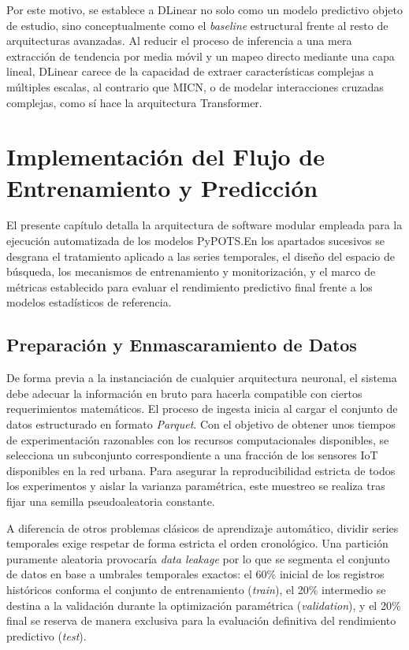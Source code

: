 Por este motivo, se establece a DLinear no solo como un modelo predictivo objeto de estudio, sino conceptualmente como el \textit{baseline} estructural frente al resto de arquitecturas avanzadas. Al reducir el proceso de inferencia a una mera extracción de tendencia por media móvil y un mapeo directo mediante una capa lineal, DLinear carece de la capacidad de extraer características complejas a múltiples escalas, al contrario que MICN, o de modelar interacciones cruzadas complejas, como sí hace la arquitectura Transformer.





\section{Implementación del Flujo de Entrenamiento y Predicción}
\label{flujo_imput_pred}

El presente capítulo detalla la arquitectura de software modular empleada para la ejecución automatizada de los modelos PyPOTS.En los apartados sucesivos se desgrana el tratamiento aplicado a las series temporales, el diseño del espacio de búsqueda, los mecanismos de entrenamiento y monitorización, y el marco de métricas establecido para evaluar el rendimiento predictivo final frente a los modelos estadísticos de referencia.

\subsection{Preparación y Enmascaramiento de Datos}
\label{sec:data_preparation}

De forma previa a la instanciación de cualquier arquitectura neuronal, el sistema debe adecuar la información en bruto para hacerla compatible con ciertos requerimientos matemáticos. El proceso de ingesta inicia al cargar el conjunto de datos estructurado en formato \textit{Parquet}. Con el objetivo de obtener unos tiempos de experimentación razonables con los recursos computacionales disponibles, se selecciona un subconjunto correspondiente a una fracción de los sensores IoT disponibles en la red urbana. Para asegurar la reproducibilidad estricta de todos los experimentos y aislar la varianza paramétrica, este muestreo se realiza tras fijar una semilla pseudoaleatoria constante. 

A diferencia de otros problemas clásicos de aprendizaje automático, dividir series temporales exige respetar de forma estricta el orden cronológico. Una partición puramente aleatoria provocaría \textit{data leakage} por lo que se segmenta el conjunto de datos en base a umbrales temporales exactos: el 60\% inicial de los registros históricos conforma el conjunto de entrenamiento (\textit{train}), el 20\% intermedio se destina a la validación durante la optimización paramétrica (\textit{validation}), y el 20\% final se reserva de manera exclusiva para la evaluación definitiva del rendimiento predictivo (\textit{test}).

